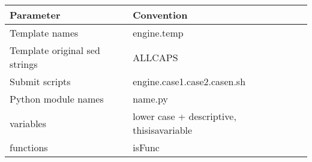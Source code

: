 \documentclass[12pt,twoside]{article}
\begin{document}
\begin{tabular}{ | l | l | p{20cm}  }
  \textbf{Parameter} &  \textbf{Convention} \\
  \hline
  Template names & engine.temp \\
  Template original sed strings &  ALLCAPS \\
  Submit scripts &  engine.case1.case2.casen.sh\\
  Python module names & name.py\\
  variables & lower case + descriptive, thisisavariable\\
  functions & isFunc\\
    
\end{tabular}
\end{document}
